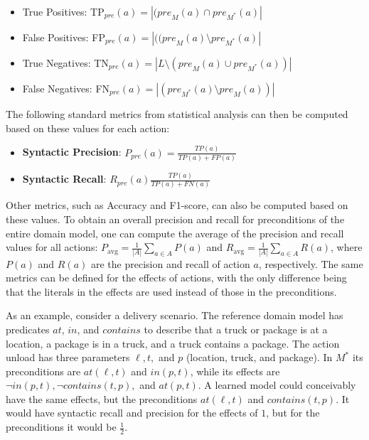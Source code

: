 \documentclass{article}
\theoremstyle{definition}
\theoremstyle{remark}
\newcommand{\realm}{{\ensuremath{M^*}}\xspace}
\newcommand{\pre}{\ensuremath{\textit{pre}}\xspace}
\newcommand{\eff}{\ensuremath{\textit{eff}}\xspace}
\newif\ifaddcomments
\newcommand{\roni}[1]{\ifaddcomments{\textcolor{red}{[Roni: #1]}}\fi}
\newcommand{\gregor}[1]{\ifaddcomments{\textcolor{orange}{[Gregor: #1]}}\fi}
\begin{document}
 \begin{itemize}
    \item True Positives: TP$_\pre(a)=|(\pre_M(a)\cap \pre_\realm(a)|$
    \item False Positives: FP$_\pre(a)=|((\pre_M(a)\setminus \pre_\realm(a)|$
    \item True Negatives: TN$_\pre(a)=|L \setminus(\pre_M(a)\cup \pre_\realm(a))|$
    \item False Negatives: FN$_\pre(a)=|(\pre_\realm(a)\setminus \pre_M(a))|$
\end{itemize}
The following standard metrics from statistical analysis can then be computed based on these values for each action:
\begin{itemize}
    \item \textbf{Syntactic Precision}: $P_\pre(a)=\frac{TP(a)}{TP(a)+FP(a)}$
    \item \textbf{Syntactic Recall}: $R_\pre(a)\frac{TP(a)}{TP(a)+FN(a)}$
\end{itemize}
Other metrics, such as Accuracy and F1-score, can also be computed based on these values. 
To obtain an overall precision and recall for preconditions of the entire domain model, one can compute the average of the precision and recall values for all actions:
$P_\text{avg}=\frac{1}{|A|}\sum_{a\in A} P(a)$ and $R_\text{avg}=\frac{1}{|A|}\sum_{a\in A} R(a)$, where $P(a)$ and $R(a)$ are the precision and recall of action $a$, respectively. 
The same metrics can be defined for the effects of actions, with the only difference being that the literals in the effects are used instead of those in the preconditions. 

\roni{TODO: Add an example}
\gregor{Proposed this ``pathological'' example}
\roni{Not sure about this. It is just an example, not a "corner case".}
\roni{We need to split this example. The first part just explains how to compute the precision and recall. The second part shows why this is a bad metric. The second part should be moved to the be under the ``Drawbacks in Syntactic Similarity'' subsection later.}
As an example, consider a delivery scenario.
The reference domain model has predicates $at$, $in$, and $contains$ to describe that a truck or package is at a location, a package is in a truck, and a truck contains a package.
The action unload has three parameters $\ell, t,$ and $p$ (location, truck, and package).
In $\realm$ its preconditions are $at(\ell, t)$ and $in(p,t)$, while its effects are $\neg in(p,t), \neg contains(t,p),$ and $at(p,t)$.
A learned model could conceivably have the same effects, but the preconditions $at(\ell, t)$ and $contains(t,p)$.
It would have syntactic recall and precision for the effects of $1$, but for the preconditions it would be $\frac 1 2$.
\end{document}
